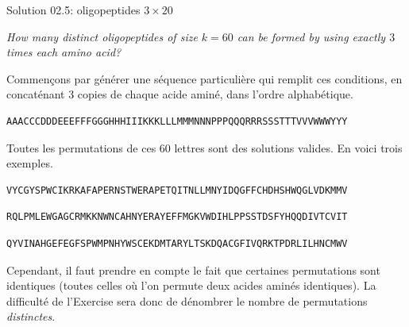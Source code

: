 \documentclass[ignorenonframetext,]{beamer}
\begin{document}
\begin{frame}[fragile]{Solution 02.5: oligopeptides \(3 \times 20\)}
\protect\hypertarget{solution-02.5-oligopeptides-3-times-20}{}

\emph{How many distinct oligopeptides of size \(k=60\) can be formed by
using exactly \(3\) times each amino acid?}

Commençons par générer une séquence particulière qui remplit ces
conditions, en concaténant 3 copies de chaque acide aminé, dans l'ordre
alphabétique.

\begin{verbatim}
AAACCCDDDEEEFFFGGGHHHIIIKKKLLLMMMNNNPPPQQQRRRSSSTTTVVVWWWYYY
\end{verbatim}

Toutes les permutations de ces 60 lettres sont des solutions valides. En
voici trois exemples.

\begin{verbatim}
VYCGYSPWCIKRKAFAPERNSTWERAPETQITNLLMNYIDQGFFCHDHSHWQGLVDKMMV
\end{verbatim}

\begin{verbatim}
RQLPMLEWGAGCRMKKNWNCAHNYERAYEFFMGKVWDIHLPPSSTDSFYHQQDIVTCVIT
\end{verbatim}

\begin{verbatim}
QYVINAHGEFEGFSPWMPNHYWSCEKDMTARYLTSKDQACGFIVQRKTPDRLILHNCMWV
\end{verbatim}

Cependant, il faut prendre en compte le fait que certaines permutations
sont identiques (toutes celles où l'on permute deux acides aminés
identiques). La difficulté de l'Exercise sera donc de dénombrer le
nombre de permutations \emph{distinctes}.

\end{frame}
\end{document}
